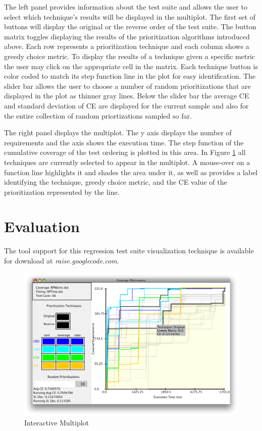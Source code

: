 \documentclass{vgtc}                          %
\begin{document}
The left panel provides information about the test suite and allows the user to select which technique's results will be displayed in the multiplot.  The first set of buttons will display the original or the reverse order of the test suite.  The button matrix toggles displaying the results of the prioritization algorithms introduced above.  Each row represents a prioritization technique and each column shows a greedy choice metric.  To display the results of a technique given a specific metric the user may click on the appropriate cell in the matrix.  Each technique button is color coded to match its step function line in the plot for easy identification.  The slider bar allows the user to choose a number of random prioritizations that are displayed in the plot as thinner gray lines.  Below the slider bar the average CE and standard deviation of CE are displayed for the current sample and also for the entire collection of random priortizations sampled so far.

The right panel displays the multiplot.   The y axis displays the number of requirements and the axis shows the execution time.  The step function of the cumulative coverage of the test ordering is plotted in this area.  In Figure \ref{fig:screenshot} all techniques are currently selected to appear in the multiplot.  A mouse-over on a function line highlights it and shades the area under it, as well as provides a label identifying the technique, greedy choice metric, and the CE value of the prioritization represented by the line.    

\section{Evaluation}

 The tool support for this regression test suite visualization technique is available for download at \textit{raise.googlecode.com}.
 
\begin{figure}
\includegraphics[scale=.25]{screenshot.png}
\caption{Interactive Multiplot}
\label{fig:screenshot}
\end{figure}




\end{document}
